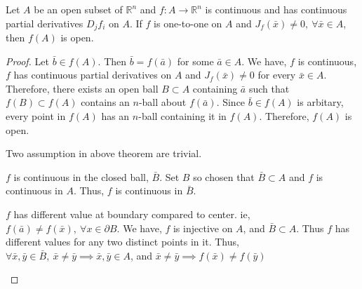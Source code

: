 \begin{theorem}
	Let $A$ be an open subset of $\mathbb{R}^n$ and $f : A \to \mathbb{R}^n$ is continuous and has continuous partial derivatives $D_jf_i$ on $A$. If $f$ is one-to-one on $A$ and $J_f(\bar{x}) \ne 0,\ \forall \bar{x} \in A$, then $f(A)$ is open.
\end{theorem}
\begin{proof}
	Let $\bar{b} \in f(A)$. Then $\bar{b} = f(\bar{a})$ for some $\bar{a} \in A$.
	We have, $f$ is continuous, $f$ has continuous partial derivatives on $A$ and $J_f(\bar{x}) \ne 0$ for every $\bar{x} \in A$.
	Therefore, there exists an open ball $B \subset A$ containing $\bar{a}$ such that $f(B) \subset f(A)$ contains an $n$-ball about $f(\bar{a})$.
	Since $\bar{b} \in f(A)$ is arbitary, every point in $f(A)$ has an $n$-ball containing it in $f(A)$.
	Therefore, $f(A)$ is open.

\begin{commentary} Two assumption in above theorem are trivial.
\begin{enumerate*}
	\item $f$ is continuous in the closed ball, $\bar{B}$.
Set $B$ so chosen that $\bar{B} \subset A$ and $f$ is continuous in $A$.
Thus, $f$ is continuous in $\bar{B}$.
	\item $f$ has different value at boundary compared to center.
ie, $f(\bar{a}) \ne f(\bar{x}),\ \forall x \in \partial B$.
	We have, $f$ is injective on $A$, and $\bar{B} \subset A$.
	Thus $f$ has different values for any two distinct points in it.
Thus, $\forall \bar{x},\bar{y} \in \bar{B},\  \bar{x} \ne \bar{y} \implies \bar{x}, \bar{y} \in A$, and $\bar{x} \ne \bar{y} \implies f(\bar{x}) \ne f(\bar{y})$ \end{enumerate*}
\end{commentary}
\end{proof}

